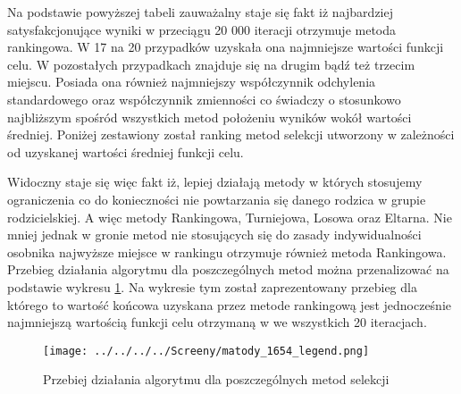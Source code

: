 Na podstawie powyższej tabeli zauważalny staje się fakt iż najbardziej satysfakcjonujące wyniki w przeciągu 20 000 iteracji otrzymuje metoda rankingowa. W 17 na 20 przypadków uzyskała ona najmniejsze wartości funkcji celu. W pozostałych przypadkach znajduje się na drugim bądź też trzecim miejscu. Posiada ona również najmniejszy współczynnik odchylenia standardowego oraz współczynnik zmienności co świadczy o stosunkowo najbliższym spośród wszystkich metod położeniu wyników wokół wartości średniej. Poniżej zestawiony został ranking metod selekcji utworzony w zależności od uzyskanej wartości średniej funkcji celu.\\

\begin{table}[h!]
\begin{center}
\caption{Ranking metod selekcji na podstawie średniej wartości błędu względnego funkcji celu}
\label{ranking_1}
\end{center}
\end{table}

Widoczny staje się więc fakt iż, lepiej działają metody w których stosujemy ograniczenia co do konieczności nie powtarzania się danego rodzica w grupie rodzicielskiej. A więc metody Rankingowa, Turniejowa, Losowa oraz Eltarna. Nie mniej jednak w gronie metod nie stosujących się do zasady indywidualności osobnika najwyższe miejsce w rankingu otrzymuje również metoda Rankingowa. Przebieg działania algorytmu dla poszczególnych metod można przenalizować na podstawie wykresu \ref{ranking}. Na wykresie tym został zaprezentowany przebieg dla którego to wartość końcowa uzyskana przez metode rankingową jest jednocześnie najmniejszą wartością funkcji celu otrzymaną w we wszystkich 20 iteracjach.\\
\begin{figure}[ht]
		\texttt{[image: ../../../../Screeny/matody\_1654\_legend.png]}
		\caption{Przebiej działania algorytmu dla poszczególnych metod selekcji}
		\label{ranking}			
\end{figure}

